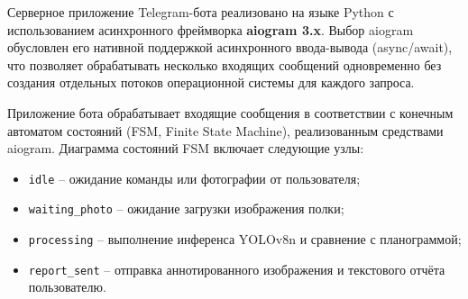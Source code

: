 {\gostFont

	\par \redline Серверное приложение Telegram-бота реализовано на языке Python с использованием асинхронного фреймворка \textbf{aiogram 3.x}.
	Выбор aiogram обусловлен его нативной поддержкой асинхронного ввода-вывода (async/await), что позволяет обрабатывать несколько входящих сообщений одновременно без создания отдельных потоков операционной системы для каждого запроса.
	\par \redline Приложение бота обрабатывает входящие сообщения в соответствии с конечным автоматом состояний (FSM, Finite State Machine), реализованным средствами aiogram.
	Диаграмма состояний FSM включает следующие узлы:

	\begin{itemize}[leftmargin=2.15cm, labelwidth=0.65cm, labelsep=0.0cm]

		\item[\theitemcntr.] \texttt{idle} {--} ожидание команды или фотографии от пользователя;
		\addtocounter{itemcntr}{1}

		\item[\theitemcntr.] \texttt{waiting\_photo} {--} ожидание загрузки изображения полки;
		\addtocounter{itemcntr}{1}

		\item[\theitemcntr.] \texttt{processing} {--} выполнение инференса YOLOv8n и сравнение с планограммой;
		\addtocounter{itemcntr}{1}

		\item[\theitemcntr.] \texttt{report\_sent} {--} отправка аннотированного изображения и текстового отчёта пользователю.
		\addtocounter{itemcntr}{1}

	\end{itemize} \setcounter{itemcntr}{1}

}
